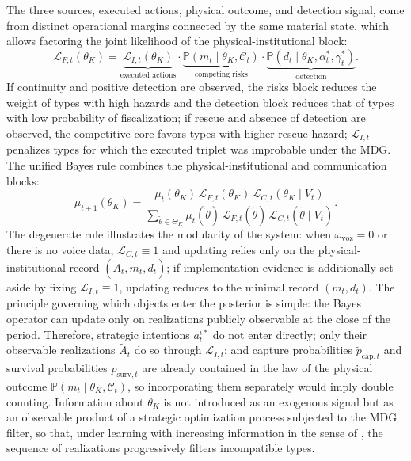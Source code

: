 \documentclass[review,authoryear,12pt]{elsarticle}
\theoremstyle{plain}
\theoremstyle{definition}
\newcommand{\Prob}{\mathbb{P}}
\newcommand{\ThetaK}{\Theta_K}
\newcommand{\1}{\mathbf{1}}
\begin{document}
The three sources, executed actions, physical outcome, and detection signal, come from distinct operational margins connected by the same material state, which allows factoring the joint likelihood of the physical-institutional block:
\begin{equation}
\mathcal{L}_{F,t}(\theta_K)=\underbrace{\mathcal{L}_{I,t}(\theta_K)}_{\text{executed actions}}\cdot\underbrace{\Prob(m_t\mid\theta_K,\mathcal{C}_t)}_{\text{competing risks}}\cdot\underbrace{\Prob(d_t\mid\theta_K,\alpha_t^\ast,\gamma_t^\ast)}_{\text{detection}}.
\label{eq:LF-joint}
\end{equation}
If continuity and positive detection are observed, the risks block reduces the weight of types with high hazards and the detection block reduces that of types with low probability of fiscalization; if rescue and absence of detection are observed, the competitive core favors types with higher rescue hazard; $\mathcal{L}_{I,t}$ penalizes types for which the executed triplet was improbable under the MDG. The unified Bayes rule combines the physical-institutional and communication blocks:
\begin{equation}
\mu_{t+1}(\theta_K)=\frac{\mu_t(\theta_K)\,\mathcal{L}_{F,t}(\theta_K)\,\mathcal{L}_{C,t}(\theta_K\mid V_t)}{\sum_{\tilde\theta\in\ThetaK}\mu_t(\tilde\theta)\,\mathcal{L}_{F,t}(\tilde\theta)\,\mathcal{L}_{C,t}(\tilde\theta\mid V_t)}.
\label{eq:bayes-update}
\end{equation}
The degenerate rule illustrates the modularity of the system: when $\omega_{\mathrm{voz}}=0$ or there is no voice data, $\mathcal{L}_{C,t}\equiv 1$ and updating relies only on the physical-institutional record $(\tilde{A}_t,m_t,d_t)$; if implementation evidence is additionally set aside by fixing $\mathcal{L}_{I,t}\equiv 1$, updating reduces to the minimal record $(m_t,d_t)$. The principle governing which objects enter the posterior is simple: the Bayes operator can update only on realizations publicly observable at the close of the period. Therefore, strategic intentions $a_t^{i\ast}$ do not enter directly; only their observable realizations $\tilde{A}_t$ do so through $\mathcal{L}_{I,t}$; and capture probabilities $\tilde{p}_{\mathrm{cap},t}$ and survival probabilities $p_{\mathrm{surv},t}$ are already contained in the law of the physical outcome $\Prob(m_t\mid\theta_K,\mathcal{C}_t)$, so incorporating them separately would imply double counting. Information about $\theta_K$ is not introduced as an exogenous signal but as an observable product of a strategic optimization process subjected to the MDG filter, so that, under learning with increasing information in the sense of \citet{BlackwellDubins1962}, the sequence of realizations progressively filters incompatible types.
\end{document}
